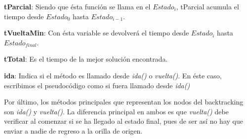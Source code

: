 \textbf{tParcial}: Siendo que ésta función se llama en el $Estado_i$, tParcial acumula el tiempo desde $Estado_0$ hasta $Estado_{i-1}$.

\textbf{tVueltaMin}: Con ésta variable se devolverá el tiempo desde $Estado_i$ hasta $Estado_{final}$.

\textbf{tTotal}: Es el tiempo de la mejor solución encontrada.

\textbf{ida}: Indica si el método es llamado desde \textit{ida()} o \textit{vuelta()}. En éste caso, escribimos el pseudocódigo como si fuera llamado desde \textit{ida()}

\vspace*{5mm}

Por último, los métodos principales que representan los nodos del backtracking son \textit{ida()} y \textit{vuelta()}. La diferencia principal en ambos es que \textit{vuelta()} debe verificar al comenzar si se ha llegado al estado final, pues de ser así no hay que enviar a nadie de regreso a la orilla de origen.

